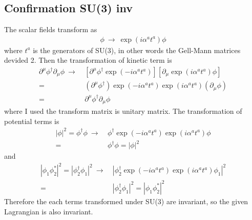 \subsection{Confirmation SU(3) inv}
The scalar fields transform as
\begin{align*}
    \phi\ \to\ \exp\left(i\alpha^at^a\right)\phi
\end{align*}
where $t^a$ is the generators of SU(3), in other words the Gell-Mann matrices devided 2. Then the transformation of kinetic term is
\begin{align}
    \partial^{\mu}\phi^{\dag}\partial_{\mu}\phi\ \to\ &[\partial^{\mu}\phi^{\dag}\exp\left(-i\alpha^at^a\right)][\partial_{\mu}\exp\left(i\alpha^at^a\right)\phi]\nonumber\\
    =&(\partial^{\mu}\phi^{\dag})\exp\left(-i\alpha^at^a\right)\exp\left(i\alpha^at^a\right)(\partial_{\mu}\phi)\nonumber\\
    =&\partial^{\mu}\phi^{\dag}\partial_{\mu}\phi
\end{align}
where I used the transform matrix is unitary matrix. The transformation of potential terms is
\begin{align}
    |\phi|^2=\phi^{\dag}\phi\ \to\ &\phi^{\dag}\exp\left(-i\alpha^at^a\right)\exp\left(i\alpha^at^a\right)\phi\nonumber\\
    =&\phi^{\dag}\phi=|\phi|^2
\end{align}
and
\begin{align}
    |\phi_1\phi_2^*|^2=|\phi_2^{\dag}\phi_1|^2\ \to\ &|\phi_2^{\dag}\exp\left(-i\alpha^at^a\right)\exp\left(i\alpha^at^a\right)\phi_1|^2\nonumber\\
    =&|\phi_2^{\dag}\phi_1|^2=|\phi_1\phi_2^*|^2
\end{align}
Therefore the each terms transformed under SU(3) are invariant, so the given Lagrangian is also invariant.

